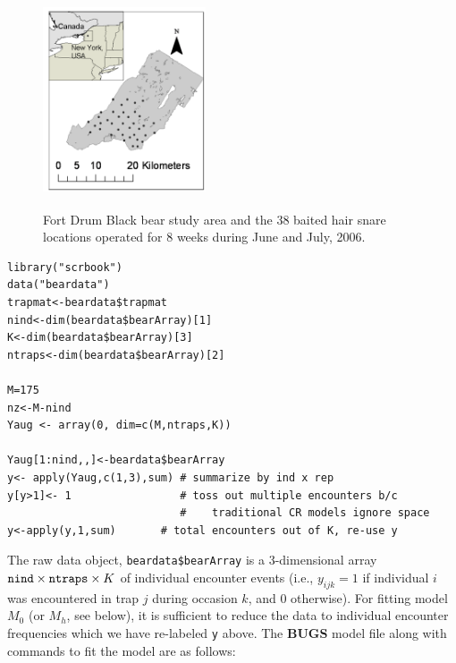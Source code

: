 \begin{figure}
\centering
\includegraphics[height=2.5in,width=1.9in]{Ch3-Closed/figs/hairsnares.png}
\caption{Fort Drum Black bear study area and the 38 baited hair snare
  locations operated for 8 weeks during June and July, 2006.}
\label{fig.3.bears1}
\end{figure}

{\small
\begin{verbatim}
library("scrbook")
data("beardata")
trapmat<-beardata$trapmat
nind<-dim(beardata$bearArray)[1]
K<-dim(beardata$bearArray)[3]
ntraps<-dim(beardata$bearArray)[2]

M=175
nz<-M-nind
Yaug <- array(0, dim=c(M,ntraps,K))

Yaug[1:nind,,]<-beardata$bearArray
y<- apply(Yaug,c(1,3),sum) # summarize by ind x rep
y[y>1]<- 1                 # toss out multiple encounters b/c
                           #    traditional CR models ignore space
y<-apply(y,1,sum)       # total encounters out of K, re-use y
\end{verbatim}
}


The raw data object, \mbox{\tt beardata\$bearArray} is a 3-dimensional
array $\mbox{\tt nind} \times \mbox{\tt ntraps} \times K$ of
individual encounter events (i.e., $y_{ijk} = 1$ if individual $i$ was
encountered in trap $j$ during occasion $k$, and 0 otherwise).  For
fitting model $M_{0}$ (or $M_{h}$, see below), it is sufficient to
reduce the data to individual encounter frequencies which we have
re-labeled \mbox{\tt y} above.  The {\bf BUGS} model file along with
commands to fit the model are as follows:

